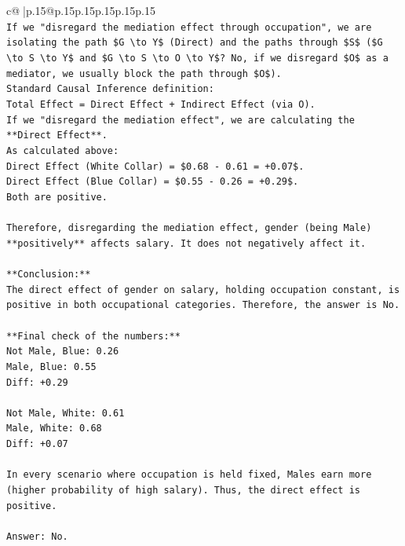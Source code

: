 \documentclass{article}
\begin{document}
{\begin{supertabular}{c@{$\;$}|p{.15\linewidth}@{}p{.15\linewidth}p{.15\linewidth}p{.15\linewidth}p{.15\linewidth}p{.15\linewidth}}
{{{\\ 
\texttt{If we "disregard the mediation effect through occupation", we are isolating the path \$G \textbackslash{}to Y\$ (Direct) and the paths through \$S\$ (\$G \textbackslash{}to S \textbackslash{}to Y\$ and \$G \textbackslash{}to S \textbackslash{}to O \textbackslash{}to Y\$? No, if we disregard \$O\$ as a mediator, we usually block the path through \$O\$).} \\
\texttt{Standard Causal Inference definition:} \\
\texttt{Total Effect = Direct Effect + Indirect Effect (via O).} \\
\texttt{If we "disregard the mediation effect", we are calculating the **Direct Effect**.} \\
\texttt{As calculated above:} \\
\texttt{Direct Effect (White Collar) = \$0.68 {-} 0.61 = +0.07\$.} \\
\texttt{Direct Effect (Blue Collar) = \$0.55 {-} 0.26 = +0.29\$.} \\
\texttt{Both are positive.} \\
\\ 
\texttt{Therefore, disregarding the mediation effect, gender (being Male) **positively** affects salary. It does not negatively affect it.} \\
\\ 
\texttt{**Conclusion:**} \\
\texttt{The direct effect of gender on salary, holding occupation constant, is positive in both occupational categories. Therefore, the answer is No.} \\
\\ 
\texttt{**Final check of the numbers:**} \\
\texttt{Not Male, Blue: 0.26} \\
\texttt{Male, Blue: 0.55} \\
\texttt{Diff: +0.29} \\
\\ 
\texttt{Not Male, White: 0.61} \\
\texttt{Male, White: 0.68} \\
\texttt{Diff: +0.07} \\
\\ 
\texttt{In every scenario where occupation is held fixed, Males earn more (higher probability of high salary). Thus, the direct effect is positive.} \\
\\ 
\texttt{Answer: No.} \\
}}}
\end{supertabular}}
\end{document}
